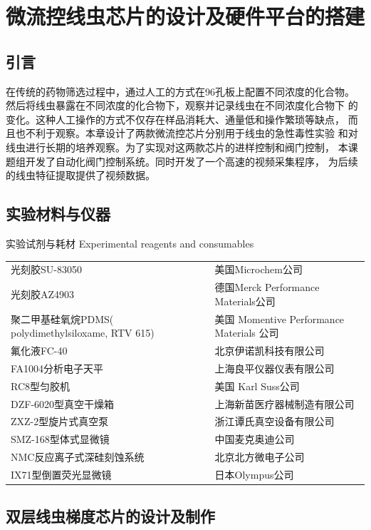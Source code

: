 \chapter{微流控线虫芯片的设计及硬件平台的搭建}
\section{引言}
	在传统的药物筛选过程中，通过人工的方式在96孔板上配置不同浓度的化合物。
	然后将线虫暴露在不同浓度的化合物下，观察并记录线虫在不同浓度化合物下
	的变化。这种人工操作的方式不仅存在样品消耗大、通量低和操作繁琐等缺点， 
	而且也不利于观察。本章设计了两款微流控芯片分别用于线虫的急性毒性实验
	和对线虫进行长期的培养观察。为了实现对这两款芯片的进样控制和阀门控制，
	本课题组开发了自动化阀门控制系统。同时开发了一个高速的视频采集程序，
	为后续的线虫特征提取提供了视频数据。
\section{实验材料与仪器}
	\begin{table}[htbp]
	\centering
	\bicaption
    {实验试剂与耗材}
    {Experimental reagents and consumables}
	\begin{tabular}{p{150pt}p{230pt}}
	\toprule
		光刻胶SU-83050 & 美国Microchem公司\\
		光刻胶AZ4903 & 德国Merck Performance Materials公司\\
		聚二甲基硅氧烷PDMS( polydimethylsiloxame, RTV 615) &美国 Momentive Performance Materials 公司\\
		氟化液FC-40 & 北京伊诺凯科技有限公司\\
		FA1004分析电子天平 & 上海良平仪器仪表有限公司\\
		RC8型匀胶机 & 美国 Karl Suss公司\\
		DZF-6020型真空干燥箱& 上海新苗医疗器械制造有限公司\\
		ZXZ-2型旋片式真空泵 & 浙江谭氏真空设备有限公司\\
		SMZ-168型体式显微镜& 中国麦克奥迪公司 \\
		NMC反应离子式深硅刻蚀系统 & 北京北方微电子公司\\
		IX71型倒置荧光显微镜 & 日本Olympus公司\\
	\bottomrule
	\end{tabular}
	\end{table}	
\section{双层线虫梯度芯片的设计及制作}
